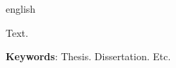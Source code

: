 

\begin{resumo}[Abstract]
 \begin{otherlanguage*}{english}

   Text.

   \noindent 
   \textbf{Keywords}: Thesis. Dissertation. Etc.
    
 \end{otherlanguage*}
\end{resumo}
